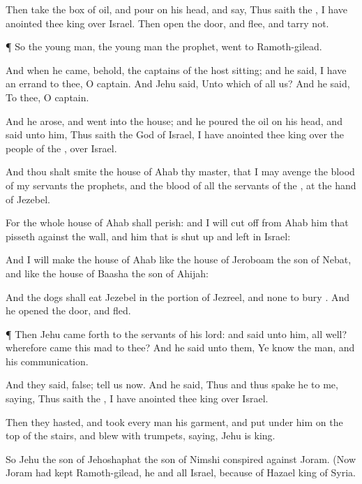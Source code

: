 {Then
take the
box of
oil, and
pour
{} on his
head, and
say, Thus
saith the
{}, I have
anointed thee
king over
Israel. Then
open the
door, and
flee, and
tarry not.


\par }{\PP {}¶ So the young
man,
{} the young
man the
prophet,
went to
Ramoth-gilead.

And when he
came, behold, the
captains of the
host
{}
sitting; and he
said, I have an
errand to thee, O
captain. And
Jehu
said, Unto which of all us? And he
said, To thee, O
captain.

And he
arose, and
went into the
house; and he
poured the
oil on his
head, and
said unto him, Thus
saith the
{}
God of
Israel, I have
anointed thee
king over the
people of the
{},
{} over
Israel.

And thou shalt
smite the
house of
Ahab thy
master, that I may
avenge the
blood of my
servants the
prophets, and the
blood of all the
servants of the
{}, at the
hand of
Jezebel.

For the whole
house of
Ahab shall
perish: and I will cut
off from
Ahab him that
pisseth against the
wall, and him that is shut
up and
left in
Israel:

And I will
make the
house of
Ahab like the
house of
Jeroboam the
son of
Nebat, and like the
house of
Baasha the
son of
Ahijah:

And the
dogs shall
eat
Jezebel in the
portion of
Jezreel, and
{} none to
bury
{}. And he
opened the
door, and
fled.


\par }{\PP {}¶ Then
Jehu came
forth to the
servants of his
lord: and
{}
said unto him,
{} all
well? wherefore
came this
mad
{} to thee? And he
said unto them, Ye
know the
man, and his
communication.

And they
said,
{}
false;
tell us now. And he
said, Thus and thus
spake he to me,
saying, Thus
saith the
{}, I have
anointed thee
king over
Israel.

Then they
hasted, and
took every
man his
garment, and
put
{} under him on the
top of the
stairs, and
blew with
trumpets,
saying,
Jehu is
king.

So
Jehu the
son of
Jehoshaphat the
son of
Nimshi
conspired against
Joram. (Now
Joram had
kept
Ramoth-gilead, he and all
Israel,
because of
Hazael
king of
Syria.

}
